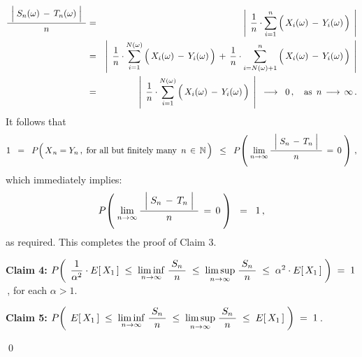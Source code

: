 \begin{enumerate}
\begin{eqnarray*}
\dfrac{{\color{white}.}
	\left\vert\;
	S_{n}(\omega) \,\overset{{\color{white}.}}{-}\, T_{n}(\omega)
	\;\right\vert
	{\color{white}.}}{
	n
	}
& = &
	\left\vert\;\,
		\dfrac{1}{n}\cdot
		\overset{n}{\underset{i=1}{\sum}}
		\left(\,X_{i}(\omega) \,\overset{{\color{white}.}}{-}\, Y_{i}(\omega)\,\right)
		\;\,\right\vert
\\
& = &
	\left\vert\;\,
		\dfrac{1}{n}\cdot
		\overset{N(\omega)}{\underset{i=1}{\sum}}
		\left(\,X_{i}(\omega) \,\overset{{\color{white}.}}{-}\, Y_{i}(\omega)\,\right)
		\,+\,
		\dfrac{1}{n}\cdot
		\overset{n}{\underset{i=N(\omega)+1}{\sum}}
		\left(\,X_{i}(\omega) \,\overset{{\color{white}.}}{-}\, Y_{i}(\omega)\,\right)
		\;\,\right\vert
\\
& = &
	\left\vert\;\,
		\dfrac{1}{n}\cdot
		\overset{N(\omega)}{\underset{i=1}{\sum}}
		\left(\,X_{i}(\omega) \,\overset{{\color{white}.}}{-}\, Y_{i}(\omega)\,\right)
		\;\,\right\vert
	\;\; \longrightarrow \;\; 0\,,
	\quad\textnormal{as \,$n \, \longrightarrow \, \infty$}\,.
\end{eqnarray*}
It follows that
\begin{equation*}
1
\;\; = \;\; 
	P\!\left(\,\overset{{\color{white}.}}{X}_{n} = Y_{n}\,,\;\textnormal{for all but finitely many \,$n\,\in\,\N$}\,\right)
\;\; \leq \;\;
	P\!\left(\;
		\underset{n\rightarrow\infty}{\lim}\,
		\dfrac{{\color{white}.}
			\left\vert\;
			S_{n} \,\overset{{\color{white}.}}{-}\, T_{n}
			\;\right\vert
			{\color{white}.}}{
			n
			}
			\,=\, 0
		\;\right)\,,
\end{equation*}
which immediately implies:
\begin{equation*}
P\!\left(\;
	\underset{n\rightarrow\infty}{\lim}\,
	\dfrac{{\color{white}.}
		\left\vert\;
		S_{n} \,\overset{{\color{white}.}}{-}\, T_{n}
		\;\right\vert
		{\color{white}.}}{
		n
		}
		\,=\, 0
	\;\right)
\;\; = \;\;
	1\,,
\end{equation*}
as required.
This completes the proof of Claim 3.

\vskip 0.8cm
\noindent
\textbf{Claim 4:}\quad\quad
$P\!\left(\;\,
	\dfrac{1}{\alpha^{2}} \cdot E[\,X_{1}\,]
	\;\leq\;
		\underset{n\rightarrow\infty}{\liminf}\;
		\dfrac{{\color{white}.}S_{n}{\color{white}.}}{n}
	\;\leq\;
		\underset{n\rightarrow\infty}{\limsup}\;
		\dfrac{{\color{white}.}S_{n}{\color{white}.}}{n}
	\;\leq\;
		\alpha^{2} \cdot E[\,X_{1}\,]
	\;\right)
\;=\;1$\,, for each $\alpha > 1$.

\vskip 0.8cm
\noindent
\textbf{Claim 5:}\quad\quad
$P\!\left(\;\,
	E[\,X_{1}\,]
	\;\leq\;
		\underset{n\rightarrow\infty}{\liminf}\;
		\dfrac{{\color{white}.}S_{n}{\color{white}.}}{n}
	\;\leq\;
		\underset{n\rightarrow\infty}{\limsup}\;
		\dfrac{{\color{white}.}S_{n}{\color{white}.}}{n}
	\;\leq\;
		E[\,X_{1}\,]
	\;\right)
\;=\;1$\,.

\end{enumerate}

\qed

\renewcommand{\theenumi}{\roman{enumi}}
\renewcommand{\labelenumi}{\textnormal{(\theenumi)}$\;\;$}

